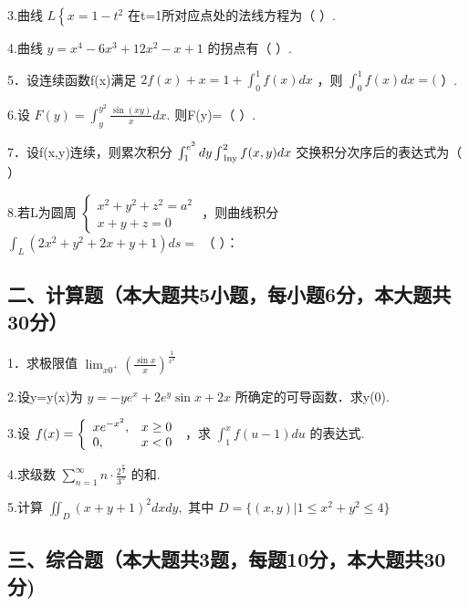 \documentclass[11pt,fontset=fandol]{ctexart}
\begin{document}
3.曲线 \(L \left\{ { x = 1 - t ^ { 2 } } \right.\)
在t=1所对应点处的法线方程为（ ）.

4.曲线 \(y = x ^ { 4 } - 6 x ^ { 3 } + 1 2 x ^ { 2 } - x + 1\)
的拐点有（ ）.

5．设连续函数f(x)满足
\(2 f ( x ) + x = 1 + \int _ { 0 } ^ { 1 } f ( x ) d x\) ，则
\(\int _ { 0 } ^ { 1 } f ( x ) d x = (\) ）.

6.设
\(F ( y ) = \int _ { y } ^ { y ^ { 2 } } \frac { \sin ( x y ) } { x } d x .\)
则F(y)=（ ）.

7．设f(x,y)连续，则累次积分
\(\int _ { 1 } ^ { e ^ { 2 } } d y \int _ { \mathrm { \scriptsize ~ l n y } } ^ { 2 } f ( x , y ) d x\)
交换积分次序后的表达式为（ ）

8.若L为圆周
\(\left\{ { \begin{array} { l } { x ^ { 2 } + y ^ { 2 } + z ^ { 2 } = a ^ { 2 } } \\ { x + y + z = 0 } \end{array} } \right.\)
，则曲线积分
\(\int _ { L } ( 2 x ^ { 2 } + y ^ { 2 } + 2 x + y + 1 ) d s =\) （ ）：

\subsection{二、计算题（本大题共5小题，每小题6分，本大题共30分）}\label{ux4e8cux8ba1ux7b97ux9898ux672cux5927ux9898ux51715ux5c0fux9898ux6bcfux5c0fux98986ux5206ux672cux5927ux9898ux517130ux5206}

1．求极限值
\(\lim _ { x  0 ^ { + } } ( { \frac { \sin x } { x } } ) ^ { \frac { 1 } { x ^ { 2 } } }\)

2.设y=y(x)为 \(y = - y e ^ { x } + 2 e ^ { y } \sin x + 2 x\)
所确定的可导函数．求y(0).

3.设
\(f ( x ) = \left\{ { \begin{array} { l l } { x e ^ { - x ^ { 2 } } , } & { x \geq 0 } \\ { 0 , } & { x < 0 } \end{array} } \right.\)
，求 \(\int _ { 1 } ^ { x } f ( u - 1 ) d u\) 的表达式.

4.求级数
\(\sum _ { n = 1 } ^ { \infty } n \cdot \frac { 2 ^ { \frac { n } { 2 } } } { 3 ^ { n } }\)
的和.

5.计算 \(\iint _ { D } ( x + y + 1 ) ^ { 2 } d x d y ,\) 其中
\(D = \{ ( x , y ) | 1 \leq x ^ { 2 } + y ^ { 2 } \leq 4 \}\)

\subsection{三、综合题（本大题共3题，每题10分，本大题共30分)}\label{ux4e09ux7efcux5408ux9898ux672cux5927ux9898ux51713ux9898ux6bcfux989810ux5206ux672cux5927ux9898ux517130ux5206}
\end{document}
